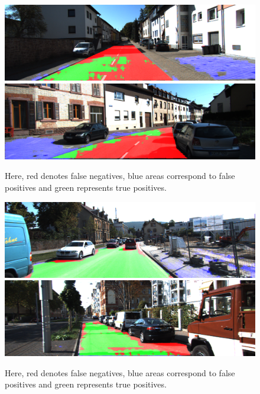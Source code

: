 \begin{figure}[p]
    \centering
    \includegraphics[scale=0.18]{figures/kitty_eval/Persp_um_road_000077.png}
    \includegraphics[scale=0.18]{figures/kitty_eval/Persp_um_road_000095.png}
    \caption{Here, red denotes false negatives, blue areas correspond to false positives and green represents true positives. }
    \label{fig:badimages}
\end{figure}





\begin{figure}[p]
    \centering
    \includegraphics[scale=0.2]{figures/kitty_eval/Persp_uu_road_000027.png}
	\includegraphics[scale=0.2]{figures/kitty_eval/Persp_uu_road_000082.png}
    \caption{Here, red denotes false negatives, blue areas correspond to false positives and green represents true positives. }
    \label{fig:badimages}
\end{figure}






%
